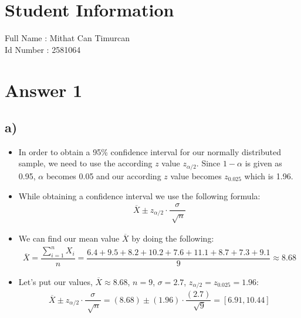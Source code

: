 \documentclass[12pt]{article}
\begin{document}
\section*{Student Information } 
Full Name : Mithat Can Timurcan \\
Id Number :  2581064\\

\section*{Answer 1}

\subsection*{a)} 
\begin{itemize}
    \item In order to obtain a 95\% confidence interval for our normally distributed sample, we need to use the according $z$ value $z_{\alpha/2}$. Since $1-\alpha$ is given as 0.95, $\alpha$ becomes 0.05 and our according $z$ value becomes $z_{0.025}$ which is 1.96.
    \item While obtaining a confidence interval we use the following formula:
    \begin{equation*}
        \begin{split}
            \overline{X} \pm z_{\alpha/2} \cdot \dfrac{\sigma}{\sqrt[]{n}}
        \end{split}
    \end{equation*}
    \item We can find our mean value $\overline{X}$ by doing the following:
    \begin{equation*}
        \begin{split}
            \overline{X} = \dfrac{\sum_{i = 1}^{n} X_i}{n} = \dfrac{6.4 + 9.5 + 8.2 + 10.2 + 7.6 + 11.1 + 8.7 + 7.3 + 9.1}{9} \approx 8.68
        \end{split}
    \end{equation*}
    \item Let's put our values, $\overline{X} \approx 8.68$, $n = 9$, $\sigma = 2.7$, $z_{\alpha/2} = z_{0.025} = 1.96$:
    \begin{equation*}
        \begin{split}
            \overline{X} \pm z_{\alpha/2} \cdot \dfrac{\sigma}{\sqrt[]{n}} = (8.68) \pm (1.96) \cdot \dfrac{(2.7)}{\sqrt[]{9}} = [6.91,10.44]
        \end{split}
    \end{equation*}
\end{itemize}
\end{document}

